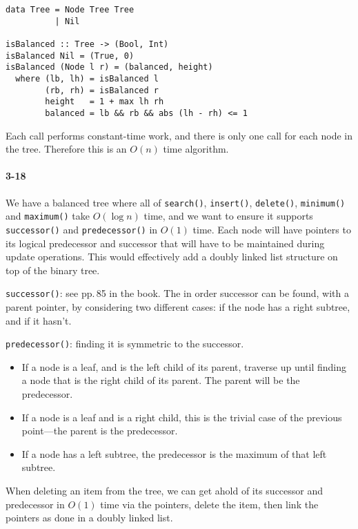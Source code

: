 \documentclass{report}
\begin{document}
\begin{lstlisting}
data Tree = Node Tree Tree
          | Nil

isBalanced :: Tree -> (Bool, Int)
isBalanced Nil = (True, 0)
isBalanced (Node l r) = (balanced, height)
  where (lb, lh) = isBalanced l
        (rb, rh) = isBalanced r
        height   = 1 + max lh rh
        balanced = lb && rb && abs (lh - rh) <= 1
\end{lstlisting}

Each call performs constant-time work, and there is only one call for each node in the tree. Therefore this is an $O(n)$ time algorithm.

\paragraph{3-18} We have a balanced tree where all of \lstinline!search()!, \lstinline!insert()!, \lstinline!delete()!, \lstinline!minimum()! and \lstinline!maximum()! take $O(\log n)$ time, and we want to ensure it supports \lstinline!successor()! and \lstinline!predecessor()! in $O(1)$ time. Each node will have pointers to its logical predecessor and successor that will have to be maintained during update operations. This would effectively add a doubly linked list structure on top of the binary tree.


\lstinline!successor()!: see pp.\,85 in the book. The in order successor can be found, with a parent pointer, by considering two different cases: if the node has a right subtree, and if it hasn't.

\lstinline!predecessor()!: finding it is symmetric to the successor.
\begin{itemize}
	\item If a node is a leaf, and is the left child of its parent, traverse up until finding a node that is the right child of its parent. The parent will be the predecessor.
	\item If a node is a leaf and is a right child, this is the trivial case of the previous point---the parent is the predecessor.
	\item If a node has a left subtree, the predecessor is the maximum of that left subtree.
\end{itemize}

When deleting an item from the tree, we can get ahold of its successor and predecessor in $O(1)$ time via the pointers, delete the item, then link the pointers as done in a doubly linked list.
\end{document}
